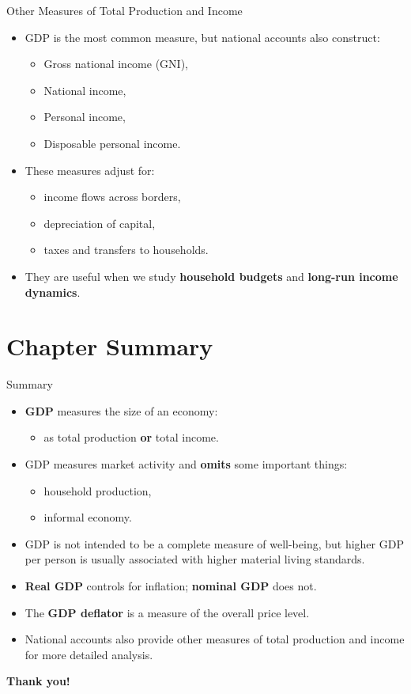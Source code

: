 \documentclass[aspectratio=169]{beamer}
\begin{document}
\begin{frame}{Other Measures of Total Production and Income}
\transfade
\begin{itemize}
  \item GDP is the most common measure, but national accounts also construct:
  \begin{itemize}
    \item Gross national income (GNI),
    \item National income,
    \item Personal income,
    \item Disposable personal income.
  \end{itemize}
  \item These measures adjust for:
  \begin{itemize}
    \item income flows across borders,
    \item depreciation of capital,
    \item taxes and transfers to households.
  \end{itemize}
  \item They are useful when we study \textbf{household budgets} and \textbf{long-run income dynamics}.
\end{itemize}
\end{frame}

\section*{Chapter Summary}

\begin{frame}{Summary}
\transfade
\begin{itemize}
  \item \textbf{GDP} measures the size of an economy:
  \begin{itemize}
    \item as total production \textbf{or} total income.
  \end{itemize}
  \item GDP measures market activity and \textbf{omits} some important things:
  \begin{itemize}
    \item household production,
    \item informal economy.
  \end{itemize}
  \item GDP is not intended to be a complete measure of well-being, but higher GDP per person is usually associated with higher material living standards.
  \item \textbf{Real GDP} controls for inflation; \textbf{nominal GDP} does not.
  \item The \textbf{GDP deflator} is a measure of the overall price level.
  \item National accounts also provide other measures of total production and income for more detailed analysis.
\end{itemize}
\end{frame}

\begin{frame}
\centering
\Huge \textbf{Thank you!}
\end{frame}
\end{document}
